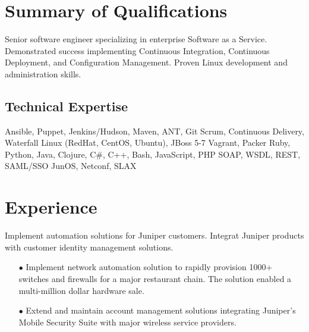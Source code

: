 \documentclass[12pt,letter,roman]{moderncv}
\begin{document}
\makecvtitle

\section{Summary of Qualifications}

Senior software engineer specializing in enterprise Software as a
Service. Demonstrated success implementing Continuous Integration, Continuous
Deployment, and Configuration Management.  Proven Linux development
and administration skills.

\subsection{Technical Expertise}

 { Ansible, Puppet, Jenkins/Hudson,
  Maven, ANT, Git }
 { Scrum, Continuous Delivery, Waterfall }
 { Linux (RedHat, CentOS, Ubuntu), JBoss 5-7 }
 { Vagrant, Packer }
 { Ruby, Python, Java, Clojure, C\#, C++, Bash, JavaScript, PHP }
 { SOAP, WSDL, REST, SAML/SSO }
 { JunOS, Netconf, SLAX }

\section{Experience}


Implement automation solutions for Juniper customers. Integrat
Juniper products with customer identity management solutions.

\begin{itemize}
  \item[$\bullet$] Implement network automation solution to rapidly provision
    1000+ switches and firewalls for a major restaurant chain.  The
    solution enabled a multi-million dollar hardware sale.

  \item[$\bullet$] Extend and maintain account management solutions
    integrating Juniper's Mobile Security Suite with major wireless
    service providers.

\end{itemize}

\vspace{0.5em}
\end{document}
